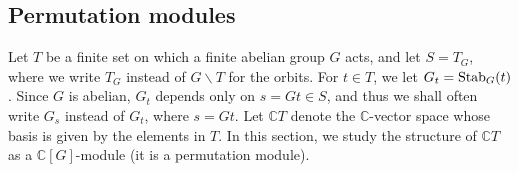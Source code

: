 \documentclass[11pt]{amsart}
\numberwithin{equation}{section}
\theoremstyle{remark}
\theoremstyle{definition}
\begin{document}
\subsection{Permutation modules} \label{permutation}
Let $T$ be a finite set on which a finite abelian group $G$ acts, and let $S = T_{G}$, where we write $T_{G}$ instead of $G \backslash T$ for the orbits.  For $t \in T$, we let $G_{t} = {\rm Stab}_{G}(t)$.  Since $G$ is abelian, $G_{t}$ depends only on $s = Gt \in S$, and thus we shall often write $G_{s}$ instead of $G_{t}$, where $s = Gt$.  Let  $\mathbb{C}T$ denote the $\mathbb{C}$-vector space whose basis is given by the elements in $T$.  In this section, we study the structure of $\mathbb{C}T$ as a $\mathbb{C}[G]$-module (it is a permutation module).  
\end{document}
